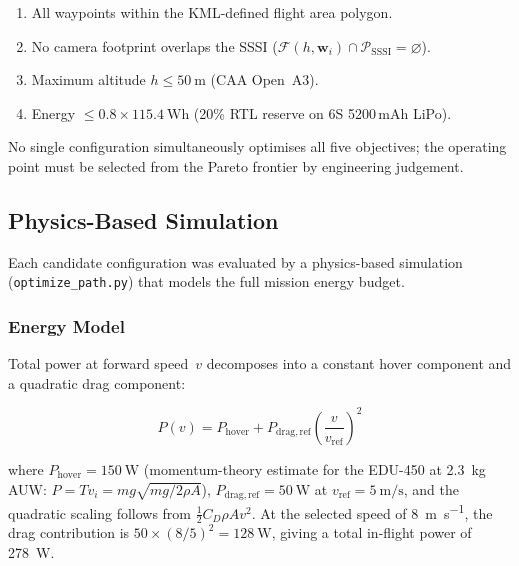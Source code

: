 \begin{enumerate}[label=\textbf{C\arabic*},leftmargin=2em]
  \item All waypoints within the KML-defined flight area polygon.
  \item No camera footprint overlaps the SSSI ($\mathcal{F}(h,\mathbf{w}_i) \cap \mathcal{P}_{\mathrm{SSSI}} = \varnothing$).
  \item Maximum altitude $h \leq \SI{50}{\metre}$ (CAA Open~A3).
  \item Energy $\leq 0.8 \times \SI{115.4}{\watt\hour}$ (20\% RTL reserve on 6S 5200\,mAh LiPo).
\end{enumerate}

\noindent No single configuration simultaneously optimises all five objectives; the operating point must be selected from the Pareto frontier by engineering judgement.

\subsection{Physics-Based Simulation}\label{sec:opt-physics}

Each candidate configuration was evaluated by a physics-based simulation (\texttt{optimize\_path.py}) that models the full mission energy budget.

\subsubsection{Energy Model}

Total power at forward speed~$v$ decomposes into a constant hover component and a quadratic drag component:

\begin{equation}\label{eq:opt-power}
  P(v) = P_{\mathrm{hover}} + P_{\mathrm{drag,ref}} \!\left(\frac{v}{v_{\mathrm{ref}}}\right)^{\!2}
\end{equation}

\noindent where $P_{\mathrm{hover}} = \SI{150}{\watt}$ (momentum-theory estimate for the EDU-450 at \SI{2.3}{\kilo\gram} AUW: $P = T v_i = mg\sqrt{mg / 2\rho A}$), $P_{\mathrm{drag,ref}} = \SI{50}{\watt}$ at $v_{\mathrm{ref}} = \SI{5}{\metre\per\second}$, and the quadratic scaling follows from $\frac{1}{2} C_D \rho A v^2$.
At the selected speed of \SI{8}{\metre\per\second}, the drag contribution is $50 \times (8/5)^2 = \SI{128}{\watt}$, giving a total in-flight power of \SI{278}{\watt}.

